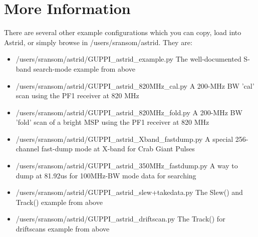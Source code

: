 \section{More Information}
\label{sec:other}
There are several other example configurations which you can copy,
load into Astrid, or simply browse in /users/sransom/astrid. They are:
\begin{itemize}
\item /users/sransom/astrid/GUPPI\_astrid\_example.py The
  well-documented S-band search-mode example from above
\item /users/sransom/astrid/GUPPI\_astrid\_820MHz\_cal.py A 200-MHz BW
  'cal' scan using the PF1 receiver at 820 MHz
\item /users/sransom/astrid/GUPPI\_astrid\_820MHz\_fold.py A 200-MHz
  BW 'fold' scan of a bright MSP using the PF1 receiver at 820 MHz
\item /users/sransom/astrid/GUPPI\_astrid\_Xband\_fastdump.py A
  special 256-channel fast-dump mode at X-band for Crab Giant Pulses
\item /users/sransom/astrid/GUPPI\_astrid\_350MHz\_fastdump.py A way
  to dump at 81.92us for 100MHz-BW mode data for searching
\item /users/sransom/astrid/GUPPI\_astrid\_slew+takedata.py The Slew() and Track() example from above
\item /users/sransom/astrid/GUPPI\_astrid\_driftscan.py The Track()
  for driftscans example from above
\end{itemize}
